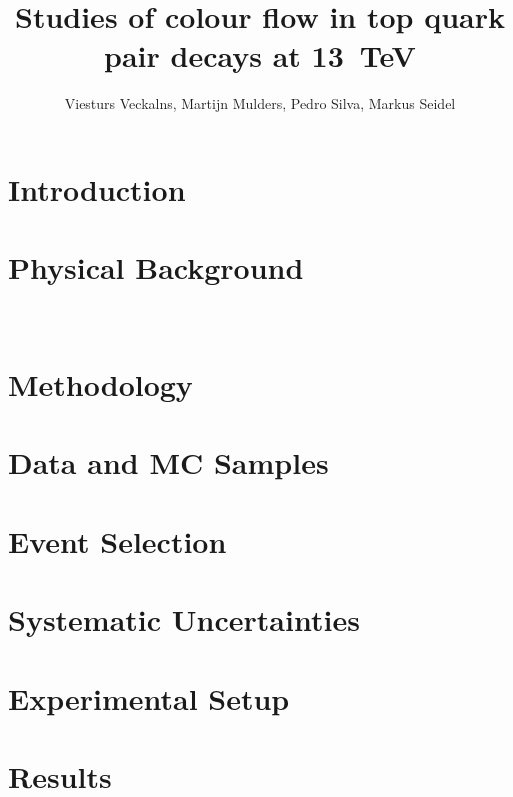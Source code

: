 \documentclass[a4paper]{article}
\date{}
\begin{document}
\title{Studies of colour flow in top quark pair decays at \SI{13}{TeV}}
\author{Viesturs Veckalns, Martijn Mulders, Pedro Silva, Markus Seidel}
\maketitle

\abstract{}

\tableofcontents
\section{Introduction}


\section{Physical Background}

\
\section{Methodology}


\section{Data and MC Samples}

\section{Event Selection}

\section{Systematic Uncertainties}


\section{Experimental Setup}


\section{Results}


\clearpage
\printbibliography
\end{document}
